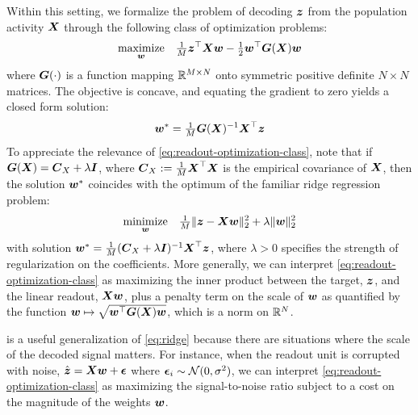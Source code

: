 Within this setting, we formalize the problem of decoding $\boldsymbol{z}$ from the population activity $\boldsymbol{X}$ through the following class of optimization problems:
\begin{align}
\label{eq:readout-optimization-class}
\underset{\boldsymbol{w}}{\text{maximize}} \quad \tfrac{1}{M} \boldsymbol{z}^\top \boldsymbol{X} \boldsymbol{w} - \tfrac{1}{2} \boldsymbol{w}^\top \boldsymbol{G}(\boldsymbol{X}) \boldsymbol{w}
\end{align}
where $\boldsymbol{G}(\cdot)$ is a function mapping $\mathbb{R}^{M \times N}$ onto symmetric positive definite $N \times N$ matrices.
The objective is concave, and equating the gradient to zero yields a closed form solution:
\begin{equation}
\label{eq:linear-readout-closed-form}
\boldsymbol{w}^* = \tfrac{1}{M} \boldsymbol{G}(\boldsymbol{X})^{-1} \boldsymbol{X}^\top \boldsymbol{z}
\end{equation}
To appreciate the relevance of \cref{eq:readout-optimization-class}, note that if $\boldsymbol{G}(\boldsymbol{X}) =  \boldsymbol{C}_X + \lambda \boldsymbol{I}$, where $\boldsymbol{C}_X:=\tfrac1M\boldsymbol{X}^\top\boldsymbol{X}$ is the empirical covariance of $\boldsymbol{X}$, then the solution $\boldsymbol{w}^*$ coincides with the optimum of the familiar ridge regression problem:
\begin{equation}
\label{eq:ridge}
\underset{\boldsymbol{w}}{\text{minimize}} \quad \tfrac{1}{M} \Vert \boldsymbol{z} - \boldsymbol{X} \boldsymbol{w} \Vert_2^2 + \lambda \Vert \boldsymbol{w} \Vert_2^2
\end{equation}
with solution $\boldsymbol{w}^* = \frac{1}{M}(\boldsymbol{C}_X + \lambda \boldsymbol{I})^{-1} \boldsymbol{X}^\top\boldsymbol{z}$, where $\lambda > 0$ specifies the strength of regularization on the coefficients.
More generally, we can interpret \cref{eq:readout-optimization-class} as maximizing the inner product between the target, $\boldsymbol{z}$, and the linear readout, $\boldsymbol{X} \boldsymbol{w}$, plus a penalty term on the scale of $\boldsymbol{w}$ as quantified by the function $\boldsymbol{w} \mapsto \sqrt{\boldsymbol{w}^\top \boldsymbol{G}(\boldsymbol{X}) \boldsymbol{w}}$, which is a norm on $\mathbb{R}^N$.

 is a useful generalization of \cref{eq:ridge} because there are situations where the scale of the decoded signal matters.
For instance, when the readout unit is corrupted with noise, $\hat{\boldsymbol{z}} = \boldsymbol{X} \boldsymbol{w} + \boldsymbol{\epsilon}$ where $\boldsymbol{\epsilon}_i \sim \mathcal{N}(0, \sigma^2)$, we can interpret \cref{eq:readout-optimization-class} as maximizing the signal-to-noise ratio subject to a cost on the magnitude of the  weights $\boldsymbol{w}$.


